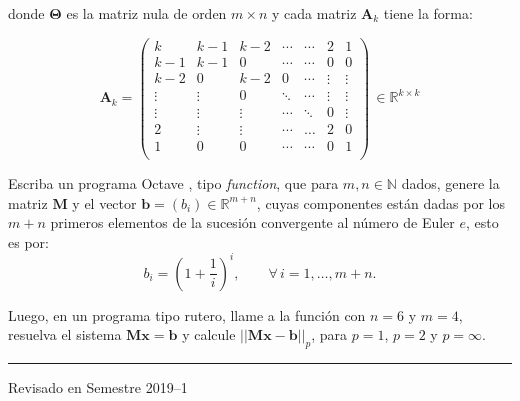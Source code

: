 \documentclass[letter,11pt]{article}
\newcommand\0{\mathbf{0}}
\newcommand{\octave}{{\sc Octave }}
\begin{document}
\begin{enumerate}
donde $\boldsymbol{\Theta}$ es la matriz nula de orden $m \times n$ y cada matriz $\boldsymbol{A}_k$  tiene la forma:

$$
\boldsymbol{A}_k=\left(
\begin{array}{ccccccc}
k    &k-1 &k-2     & \cdots & \cdots &2 &1 \\
k-1 &k-1 & 0       & \cdots &   \cdots& 0 & 0 \\
k-2 & 0  & k-2     & 0&  \cdots &  \vdots&   \vdots\\
\vdots & \vdots  &0 &\ddots  & \cdots &  \vdots &\vdots\\
\vdots  &\vdots   &\vdots   &  \cdots & \ddots&0& \vdots \\
2 & \vdots   &\vdots  & \cdots  & \dots&2 & 0 \\
1 &0  & 0 & \cdots &    \cdots& 0 &1\\
\end{array}
\right)\, \in \mathbb{R}^{k \times k}
$$



Escriba un programa \octave, tipo \textit{function}, que para  $m,n \in \mathbb{N}$ dados, genere la matriz $\boldsymbol{M}$ y el vector $\boldsymbol{b}=(b_{i})\in \mathbb{R}^{m+n}$, cuyas componentes est\'an dadas por los $m+n$ primeros elementos de la sucesi\'on  convergente al n\'umero de Euler $e$, esto es por:
$$
b_i= \left(1+\frac{1}{i}\right)^i,\qquad \forall\, i=1,\ldots,m+n.
$$

Luego, en un programa tipo rutero, llame a la funci\'on con $n=6$ y $m=4$, resuelva el sistema $\boldsymbol{Mx}=\boldsymbol{b}$ y calcule $||\boldsymbol{Mx}-\boldsymbol{b}||_p$, para $p=1$, $p=2$ y $p=\infty$.


  \end{enumerate}


\vfill
\hrule
\par
\medskip
 \hfill Revisado en Semestre 2019--1
\end{document}
